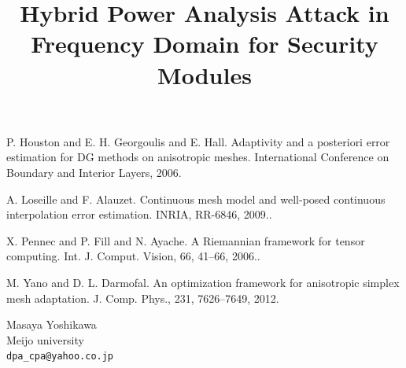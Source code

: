 \documentclass[article,A4,11pt]{llncs}%
\begin{document}

\begin{thebibliography}{10}
{\sc P. Houston and E. H. Georgoulis and E. Hall}. {Adaptivity   and a posteriori error estimation for {DG} methods on anisotropic   meshes}. International Conference on Boundary and Interior Layers,   2006.

{\sc  A. Loseille and F. Alauzet}. {Continuous mesh model and   well-posed continuous interpolation error estimation}. INRIA,   RR-6846, 2009..

{\sc X. Pennec and P. Fill and N. Ayache}. {A Riemannian   framework for tensor computing}. Int. J. Comput. Vision, 66, 41--66, 2006..

{\sc  M. Yano and D. L. Darmofal}. {An optimization framework   for anisotropic simplex mesh adaptation}. J. Comp. Phys., 231,   7626--7649, 2012.
\end{thebibliography}

\title{Hybrid Power Analysis Attack in Frequency Domain for Security Modules}
 \author{} \institute{}
\maketitle
\begin{center}
{\large Masaya Yoshikawa}\\
Meijo university\\
{\tt dpa\_cpa@yahoo.co.jp}
\end{center}
\end{document}
